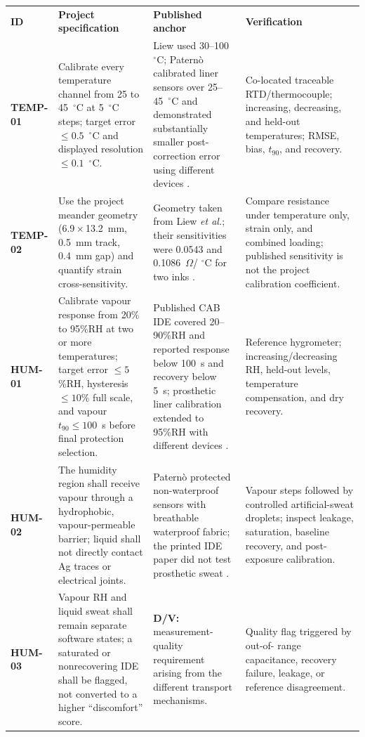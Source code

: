 \vspace{0.3em}
\begingroup
\fontsize{7.7}{9.0}\selectfont
\setlength{\tabcolsep}{3pt}\renewcommand{\arraystretch}{1.02}
\begin{tabularx}{\linewidth}{>{\raggedright\arraybackslash\bfseries\color{AUBRed}}p{1.2cm}Y Y Y}
\color{white}\textbf{ID} & \color{white}\textbf{Project specification} &
\color{white}\textbf{Published anchor} & \color{white}\textbf{Verification} \\
TEMP-01 & Calibrate every temperature channel from 25 to 45~$^{\circ}$C at
5~$^{\circ}$C steps; target error $\leq0.5$~$^{\circ}$C and displayed
resolution $\leq0.1$~$^{\circ}$C. & Liew used 30--100~$^{\circ}$C; Patern\`o
calibrated liner sensors over 25--45~$^{\circ}$C and demonstrated substantially
smaller post-correction error using different devices
\cite{liew2020,paterno2020}. & Co-located traceable RTD/thermocouple; increasing,
decreasing, and held-out temperatures; RMSE, bias, $t_{90}$, and recovery. \\
TEMP-02 & Use the project meander geometry (6.9\,$\times$\,13.2~mm, 0.5~mm
track, 0.4~mm gap) and quantify strain cross-sensitivity. & Geometry taken from
Liew \textit{et al.}; their sensitivities were 0.0543 and 0.1086~$\Omega$/
$^{\circ}$C for two inks \cite{liew2020}. & Compare resistance under temperature
only, strain only, and combined loading; published sensitivity is not the
project calibration coefficient. \\
HUM-01 & Calibrate vapour response from 20\% to 95\%RH at two or more
temperatures; target error $\leq5$\%RH, hysteresis $\leq10$\% full scale, and
vapour $t_{90}\leq100$~s before final protection selection. & Published CAB IDE
covered 20--90\%RH and reported response below 100~s and recovery below 5~s;
prosthetic liner calibration extended to 95\%RH with different devices
\cite{aitmammar2020,paterno2020}. & Reference hygrometer; increasing/decreasing
RH, held-out levels, temperature compensation, and dry recovery. \\
HUM-02 & The humidity region shall receive vapour through a hydrophobic,
vapour-permeable barrier; liquid shall not directly contact Ag traces or
electrical joints. & Patern\`o protected non-waterproof sensors with breathable
waterproof fabric; the printed IDE paper did not test prosthetic sweat
\cite{paterno2020,aitmammar2020}. & Vapour steps followed by controlled
artificial-sweat droplets; inspect leakage, saturation, baseline recovery, and
post-exposure calibration. \\
HUM-03 & Vapour RH and liquid sweat shall remain separate software states; a
saturated or nonrecovering IDE shall be flagged, not converted to a higher
``discomfort'' score. & \textbf{D/V:} measurement-quality requirement arising
from the different transport mechanisms. & Quality flag triggered by out-of-
range capacitance, recovery failure, leakage, or reference disagreement. \\
\end{tabularx}
\endgroup
{}

